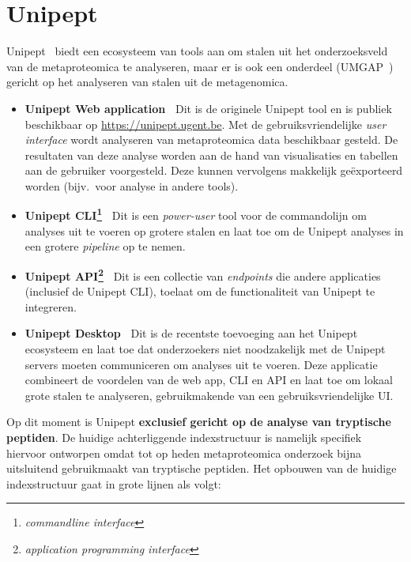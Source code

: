 \section{Unipept}\label{sec:unipept-introductie}
Unipept~\cite{unipept_orig} biedt een ecosysteem van tools aan om stalen uit het onderzoeksveld van de metaproteomica te analyseren, maar er is ook een onderdeel (UMGAP~\cite{UMGAP_paper}) gericht op het analyseren van stalen uit de metagenomica.

\begin{itemize}
    \item \textbf{Unipept Web application~\cite{unipept_orig, unipept_web, unipept_tutorial, unipept_4}} Dit is de originele Unipept tool en is publiek beschikbaar op \url{https://unipept.ugent.be}.
    Met de gebruiksvriendelijke \textit{user interface} wordt analyseren van metaproteomica data beschikbaar gesteld.
    De resultaten van deze analyse worden aan de hand van visualisaties en tabellen aan de gebruiker voorgesteld.
    Deze kunnen vervolgens makkelijk geëxporteerd worden (bijv.~voor analyse in andere tools).
    \item \textbf{Unipept CLI\footnote{\textit{commandline interface}}~\cite{unipept_cli}} Dit is een \textit{power-user} tool voor de commandolijn om analyses uit te voeren op grotere stalen en laat toe om de Unipept analyses in een grotere \textit{pipeline} op te nemen.
    \item \textbf{Unipept API\footnote{\textit{application programming interface}}~\cite{unipept_api, unipept_cli}} Dit is een collectie van \textit{endpoints} die andere applicaties (inclusief de Unipept CLI), toelaat om de functionaliteit van Unipept te integreren.
    \item \textbf{Unipept Desktop~\cite{unipept_desktop, unipept_desktop_2}} Dit is de recentste toevoeging aan het Unipept ecosysteem en laat toe dat onderzoekers niet noodzakelijk met de Unipept servers moeten communiceren om analyses uit te voeren.
    Deze applicatie combineert de voordelen van de web app, CLI en API en laat toe om lokaal grote stalen te analyseren, gebruikmakende van een gebruiksvriendelijke UI\@.
\end{itemize}

Op dit moment is Unipept \textbf{exclusief gericht op de analyse van tryptische peptiden}.
De huidige achterliggende indexstructuur is namelijk specifiek hiervoor ontworpen omdat tot op heden metaproteomica onderzoek bijna uitsluitend gebruikmaakt van tryptische peptiden.
Het opbouwen van de huidige indexstructuur gaat in grote lijnen als volgt:

